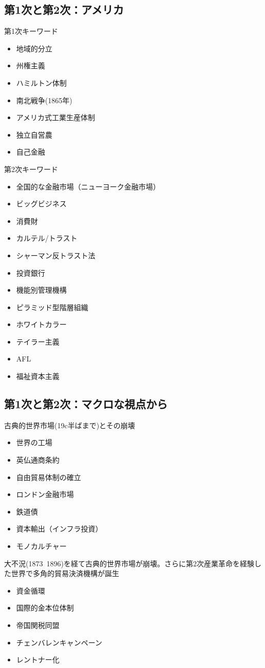 \documentclass{jsarticle}
\begin{document}
\subsection{第1次と第2次：アメリカ}
第1次キーワード
\begin{itemize}
\item 地域的分立
\item 州権主義
\item ハミルトン体制
\item 南北戦争(1865年)
\item アメリカ式工業生産体制
\item 独立自営農
\item 自己金融
\end{itemize}
第2次キーワード
\begin{itemize}
\item 全国的な金融市場（ニューヨーク金融市場）
\item ビッグビジネス
\item 消費財
\item カルテル/トラスト
\item シャーマン反トラスト法
\item 投資銀行
\item 機能別管理機構
\item ピラミッド型階層組織
\item ホワイトカラー
\item テイラー主義
\item AFL
\item 福祉資本主義
\end{itemize}

\subsection{第1次と第2次：マクロな視点から}
古典的世界市場(19c半ばまで)とその崩壊
\begin{itemize}
\item 世界の工場
\item 英仏通商条約
\item 自由貿易体制の確立
\item ロンドン金融市場
\item 鉄道債
\item 資本輸出（インフラ投資）
\item モノカルチャー
\end{itemize}
大不況(1873~1896)を経て古典的世界市場が崩壊。さらに第2次産業革命を経験した世界で多角的貿易決済機構が誕生
\begin{itemize}
\item 資金循環
\item 国際的金本位体制
\item 帝国関税同盟
\item チェンバレンキャンペーン
\item レントナー化
\end{itemize}
\end{document}
